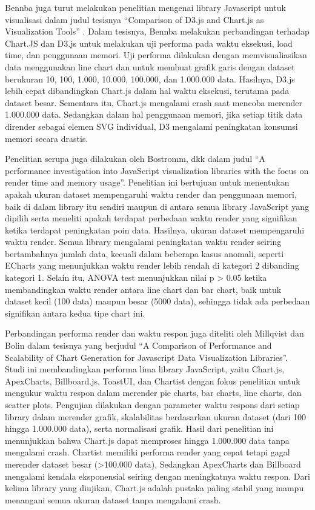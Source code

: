 Bennba juga turut melakukan penelitian mengenai library Javascript untuk visualisasi dalam judul tesisnya “Comparison of D3.js and Chart.js as Visualization Tools” \cite{Benbba2021}. Dalam tesisnya, Bennba melakukan perbandingan terhadap Chart.JS dan D3.js untuk melakukan uji performa pada waktu eksekusi, load time, dan penggunaan memori. Uji performa dilakukan dengan memvisualiasikan data menggunakan line chart dan untuk membuat grafik garis dengan dataset berukuran 10, 100, 1.000, 10.000, 100.000, dan 1.000.000 data. Hasilnya, D3.js lebih cepat dibandingkan Chart.js dalam hal waktu eksekusi, terutama pada dataset besar. Sementara itu, Chart.js mengalami crash saat mencoba merender 1.000.000 data. Sedangkan dalam hal penggunaan memori, jika setiap titik data dirender sebagai elemen SVG individual, D3 mengalami  peningkatan konsumsi memori secara drastis.

Penelitian serupa juga dilakukan oleh Bostromm, dkk \cite{Bostrm2022} dalam judul “A performance investigation into JavaScript visualization libraries with the focus on render time and memory usage”. Penelitian ini bertujuan untuk menentukan apakah ukuran dataset mempengaruhi waktu render dan penggunaan memori, baik di dalam library itu sendiri maupun di antara semua library JavaScript yang dipilih serta meneliti apakah terdapat perbedaan waktu render yang signifikan ketika terdapat peningkatan poin data. Hasilnya, ukuran dataset mempengaruhi waktu render. Semua library mengalami peningkatan waktu render seiring bertambahnya jumlah data, kecuali dalam beberapa kasus anomali, seperti ECharts yang menunjukkan waktu render lebih rendah di kategori 2 dibanding kategori 1. Selain itu, ANOVA test menunjukkan nilai p > 0.05 ketika membandingkan waktu render antara line chart dan bar chart, baik untuk dataset kecil (100 data) maupun besar (5000 data), sehingga tidak ada perbedaan signifikan antara kedua tipe chart ini. 

Perbandingan performa render dan waktu respon juga diteliti oleh Millqvist dan Bolin \cite{Millqvist2022} dalam tesisnya yang berjudul “A Comparison of Performance and Scalability of Chart Generation for Javascript Data Visualization Libraries”. Studi ini membandingkan performa lima library JavaScript, yaitu Chart.js, ApexCharts, Billboard.js, ToastUI, dan Chartist dengan fokus penelitian untuk mengukur waktu respon dalam merender pie charts, bar charts, line charts, dan scatter plots. Pengujian dilakukan dengan parameter waktu respons dari setiap library dalam merender grafik, skalabilitas berdasarkan ukuran dataset (dari 100 hingga 1.000.000 data), serta normalisasi grafik. Hasil dari penelitian ini menunjukkan bahwa Chart.js dapat memproses hingga 1.000.000 data tanpa mengalami crash. Chartist memiliki performa render yang cepat tetapi gagal merender dataset besar (>100.000 data). Sedangkan ApexCharts dan Billboard mengalami kendala eksponensial seiring dengan meningkatnya waktu respon. Dari kelima library yang diujikan, Chart.js adalah pustaka paling stabil yang mampu menangani semua ukuran dataset tanpa mengalami crash. 

